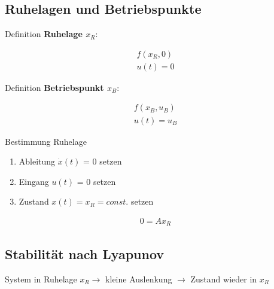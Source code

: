 \documentclass[10pt,a4paper]{article}
\begin{document}
  \subsection{Ruhelagen und Betriebspunkte}
  Definition \textbf{Ruhelage $x_R$}:
  \begin{mdframed}[style=exercise]
    \begin{align}
        f(x_R, 0) \\ u(t) = 0
    \end{align}
  \end{mdframed}
  Definition \textbf{Betriebspunkt $x_B$}:
  \begin{mdframed}[style=exercise]
    \begin{align}
        f(x_B, u_B) \\ u(t) = u_B
    \end{align}
  \end{mdframed}
  Bestimmung Ruhelage
  \begin{enumerate}
    \item Ableitung $\dot{x}(t)$ = 0 setzen 
    \item Eingang $u(t)$ = 0 setzen 
    \item Zustand $x(t) = x_R = const.$ setzen 
  \end{enumerate}
  \begin{mdframed}[style=exercise]
    \begin{align}
        0 = A x_R 
    \end{align}
  \end{mdframed}

  \newpage
  \subsection{Stabilität nach Lyapunov}
 System in Ruhelage $x_R \rightarrow$ kleine Auslenkung $\rightarrow$ Zustand wieder in $x_R$
\end{document}
